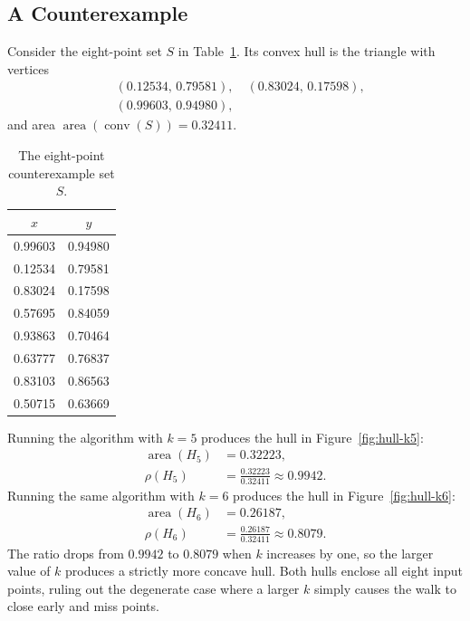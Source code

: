 \documentclass[a4paper,twoside]{article}
\begin{document}
\subsection{A Counterexample}
Consider the eight-point set \(S\) in Table~\ref{tab:ce-points}. Its convex hull is the triangle with vertices
\begin{align*}
  &(0.12534,\,0.79581), \quad (0.83024,\,0.17598),\\
  &(0.99603,\,0.94980),
\end{align*}
and area $\operatorname{area}(\operatorname{conv}(S)) = 0.32411$.

\begin{table}[h]
  \centering
  \caption{The eight-point counterexample set \(S\).}
  \label{tab:ce-points}
  \begin{tabular}{cc}
    \toprule
    \(x\) & \(y\) \\
    \midrule
    0.99603 & 0.94980 \\
    0.12534 & 0.79581 \\
    0.83024 & 0.17598 \\
    0.57695 & 0.84059 \\
    0.93863 & 0.70464 \\
    0.63777 & 0.76837 \\
    0.83103 & 0.86563 \\
    0.50715 & 0.63669 \\
    \bottomrule
  \end{tabular}
\end{table}

Running the algorithm with \(k = 5\) produces the hull in Figure~\ref{fig:hull-k5}:
\begin{align*}
  \operatorname{area}(H_5) &= 0.32223,\\
  \rho(H_5) &= \frac{0.32223}{0.32411} \approx 0.9942.
\end{align*}
Running the same algorithm with \(k = 6\) produces the hull in Figure~\ref{fig:hull-k6}:
\begin{align*}
  \operatorname{area}(H_6) &= 0.26187,\\
  \rho(H_6) &= \frac{0.26187}{0.32411} \approx 0.8079.
\end{align*}
The ratio drops from $0.9942$ to $0.8079$ when $k$ increases by one, so the larger value of $k$ produces a strictly more concave hull. Both hulls enclose all eight input points, ruling out the degenerate case where a larger $k$ simply causes the walk to close early and miss points.
\end{document}
